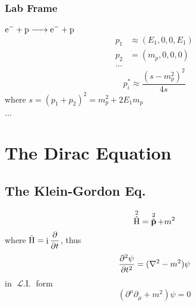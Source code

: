 \documentclass[a4paper]{article}
\DeclareMathOperator{\I}{\mathrm{i}}
\DeclareMathOperator{\hH}{\hat{H}}
\DeclareMathOperator{\hp}{\hat{\vb{p}}}
\DeclareMathOperator{\LI}{\mathscr{L}.I.}
\newcommand{\dis}{\displaystyle}
\numberwithin{equation}{section}
\begin{document}
\subsubsection{Lab Frame}
$ \ce{e^- + p -> e^- + p} $
\begin{equation}\label{key}
\begin{aligned}
p_1 &\approx (E_1, 0, 0, E_1)\\
p_2 &= (m_p, 0, 0, 0)\\
... 
\end{aligned}
\end{equation}
\begin{equation}\label{key}
p_i^* \approx \dfrac{(s - m_p^2)^2}{4s}
\end{equation}
where $ s = (p_1 + p_2)^2 = m_p^2 + 2E_1m_p $\\

...


\section{The Dirac Equation}
\subsection{The Klein-Gordon Eq.}
\begin{equation}\label{key}
\hH^2 = \hp^2 + m^2
\end{equation}
where $ \hH = \dis\I\pdv{t} $, thus
\begin{equation}\label{key}
\pdv[2]{\psi}{t} = (\nabla^2 - m^2)\psi
\end{equation}
in $ \LI $ form
\begin{equation}\label{key}
(\partial^\mu\partial_\mu + m^2)\psi = 0
\end{equation}
\end{document}
